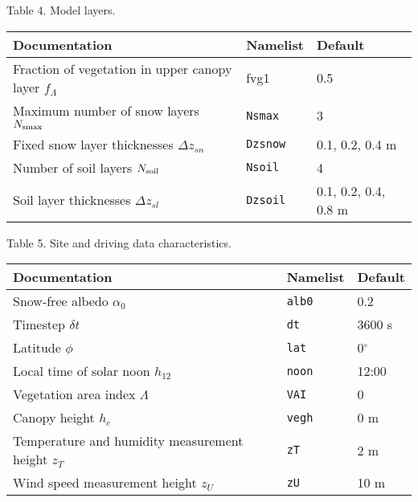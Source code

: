 \documentclass[fleqn]{article}
\begin{document}
{Table 4. Model layers.
\begin{longtable}{|l|l|l|}
\hline
Documentation                               & Namelist     & Default                \\
\hline
Fraction of vegetation in upper canopy layer $f_\Lambda$ & fvg1 & 0.5               \\ 
Maximum number of snow layers $N_{\rm smax}$  & {\tt Nsmax}  & 3                    \\
Fixed snow layer thicknesses $\Delta z_{sn}$  & {\tt Dzsnow} & 0.1, 0.2, 0.4 m      \\
Number of soil layers $N_{\rm soil}$          & {\tt Nsoil}  & 4                    \\
Soil layer thicknesses $\Delta z_{sl}$        & {\tt Dzsoil} & 0.1, 0.2, 0.4, 0.8 m \\
\hline 
\end{longtable}

Table 5. Site and driving data characteristics.
\begin{longtable}{|l|l|l|}
\hline
Documentation                       & Namelist   & Default         \\
\hline
Snow-free albedo $\alpha_0$         & {\tt alb0} & 0.2             \\
Timestep $\delta t$                 & {\tt dt}   & 3600 s          \\
Latitude $\phi$                     & {\tt lat}  & 0$^\circ$       \\
Local time of solar noon $h_{12}$   & {\tt noon} & 12:00           \\
Vegetation area index $\Lambda$     & {\tt VAI}  & 0               \\
Canopy height $h_c$                 & {\tt vegh} & 0 m             \\
Temperature and humidity measurement height $z_T$& {\tt zT} & 2 m  \\
Wind speed measurement height $z_U$ & {\tt zU}   & 10 m            \\
\hline 
\end{longtable}

}
\end{document}
